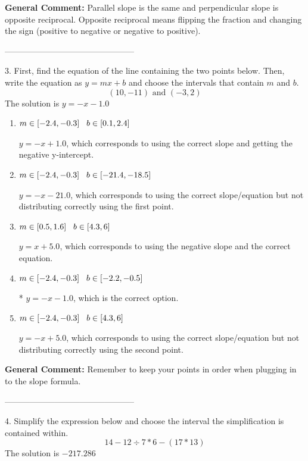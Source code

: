 \documentclass{extbook}[14pt]
\begin{document}
\textbf{General Comment:} Parallel slope is the same and perpendicular slope is opposite reciprocal. Opposite reciprocal means flipping the fraction and changing the sign (positive to negative or negative to positive). 

-----------------------------------------------

3. First, find the equation of the line containing the two points below. Then, write the equation as $ y=mx+b $ and choose the intervals that contain $m$ and $b$.
\[ (10, -11) \text{ and } (-3, 2) \] 
The solution is $ y = -x -1.0 $ 

\begin{enumerate}[label=\Alph*.] 
\item $ m \in [-2.4, -0.3] \hspace*{3mm} b \in [0.1, 2.4] $ 

  $y = -x + 1.0$, which corresponds to using the correct slope and getting the negative y-intercept. 
\item $ m \in [-2.4, -0.3] \hspace*{3mm} b \in [-21.4, -18.5] $ 

  $y = -x -21.0$, which corresponds to using the correct slope/equation but not distributing correctly using the first point. 
\item $ m \in [0.5, 1.6] \hspace*{3mm} b \in [4.3, 6] $ 

  $y = x + 5.0$, which corresponds to using the negative slope and the correct equation. 
\item $ m \in [-2.4, -0.3] \hspace*{3mm} b \in [-2.2, -0.5] $ 

 * $y = -x -1.0$, which is the correct option. 
\item $ m \in [-2.4, -0.3] \hspace*{3mm} b \in [4.3, 6] $ 

  $y = -x + 5.0$, which corresponds to using the correct slope/equation but not distributing correctly using the second point. 
\end{enumerate} 
 
\textbf{General Comment:} Remember to keep your points in order when plugging in to the slope formula. 

-----------------------------------------------

4. Simplify the expression below and choose the interval the simplification is contained within.
\[ 14 - 12 \div 7 * 6 - (17 * 13) \] 
The solution is $ -217.286 $ 
\end{document}
